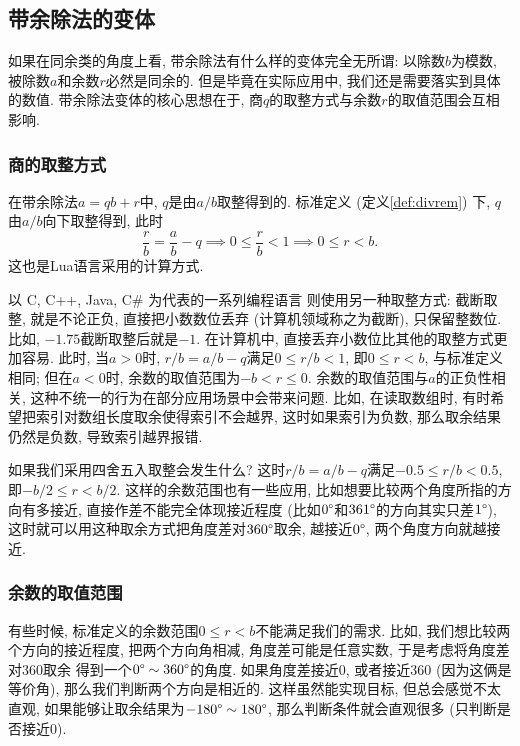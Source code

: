 \subsection{带余除法的变体}

如果在同余类的角度上看, 带余除法有什么样的变体完全无所谓:
以除数$b$为模数, 被除数$a$和余数$r$必然是同余的.
但是毕竟在实际应用中, 我们还是需要落实到具体的数值.
带余除法变体的核心思想在于,
商$q$的取整方式与余数$r$的取值范围会互相影响.

\subsubsection{商的取整方式}

在带余除法$a=qb+r$中,
$q$是由$a/b$取整得到的.
标准定义 (定义\ref{def:divrem}) 下, $q$由$a/b$向下取整得到, 此时
\[
  \dfrac rb = \dfrac ab - q \implies
  0 \le \dfrac rb < 1 \implies
  0 \le r < b.
\]
这也是Lua语言采用的计算方式.

以 C, C++, Java, C\# 为代表的一系列编程语言
则使用另一种取整方式: 截断取整,
就是不论正负, 直接把小数数位丢弃 (计算机领域称之为截断),
只保留整数位. 比如, $-1.75$截断取整后就是$-1$.
在计算机中, 直接丢弃小数位比其他的取整方式更加容易.
此时, 当$a>0$时, $r/b=a/b-q$满足$0 \le r/b < 1$,
即$0 \le r < b$, 与标准定义相同;
但在$a<0$时, 余数的取值范围为$-b < r \le 0$.
余数的取值范围与$a$的正负性相关,
这种不统一的行为在部分应用场景中会带来问题.
比如, 在读取数组时, 有时希望把索引对数组长度取余使得索引不会越界,
这时如果索引为负数, 那么取余结果仍然是负数, 导致索引越界报错.

如果我们采用四舍五入取整会发生什么?
这时$r/b = a/b - q$满足$-0.5 \le r/b < 0.5$,
即$-b/2 \le r < b/2$. 这样的余数范围也有一些应用,
比如想要比较两个角度所指的方向有多接近,
直接作差不能完全体现接近程度
(比如$0\degree$和$361\degree$的方向其实只差$1\degree$),
这时就可以用这种取余方式把角度差对$360\degree$取余,
越接近$0\degree$, 两个角度方向就越接近.

\subsubsection{余数的取值范围}

有些时候, 标准定义的余数范围$0 \le r < b$不能满足我们的需求.
比如, 我们想比较两个方向的接近程度, 把两个方向角相减,
角度差可能是任意实数, 于是考虑将角度差对360\degree 取余
得到一个$0\degree \sim 360\degree$的角度.
如果角度差接近0\degree, 或者接近360\degree
(因为这俩是等价角), 那么我们判断两个方向是相近的.
这样虽然能实现目标, 但总会感觉不太直观,
如果能够让取余结果为$-180\degree \sim 180\degree$,
那么判断条件就会直观很多 (只判断是否接近0\degree).

